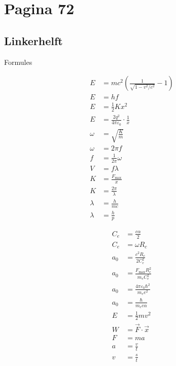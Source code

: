 \documentclass[11pt,a4paper]{article}
\begin{document}
\clearpage
\section*{Pagina 72}

\begin{minipage}[t]{0.48\textwidth}
\subsection*{Linkerhelft}

Formules

\begin{align*}
E &= mc^2\left(\frac{1}{\sqrt{1-v^2/c^2}}-1\right)
\\
E &= h f
\\
E &= \frac{1}{2}Kx^2
\\
E &= \frac{2q^2}{4\pi\varepsilon_0}\cdot \frac{1}{x}
\\[0.4em]
\omega &= \sqrt{\frac{K}{m}}
\\
\omega &= 2\pi f
\\
f &= \frac{1}{2\pi}\omega
\\
V &= f\lambda
\\
K &= \frac{F_{\max}}{x}
\\
K &= \frac{2\pi}{\lambda}
\\
\lambda &= \frac{h}{mc}
\\
\lambda &= \frac{h}{p}
\end{align*}

\begin{align*}
C_e &= \frac{c\alpha}{2}
\\
C_e &= \omega R_c
\\
a_0 &= \frac{c^2R_c}{2C_e^2}
\\
a_0 &= \frac{F_{\max}R_c^2}{m_e C_e^2}
\\
a_0 &= \frac{4\pi\varepsilon_0\hbar^2}{m_e e^2}
\\
a_0 &= \frac{\hbar}{m_e c\alpha}
\\
E &= \frac{1}{2}mv^2
\\
W &= \vec{F}\cdot\vec{x}
\\
F &= ma
\\
a &= \frac{v}{t}
\\
v &= \frac{s}{t}
\end{align*}
\end{minipage}
\hfill
\end{document}
